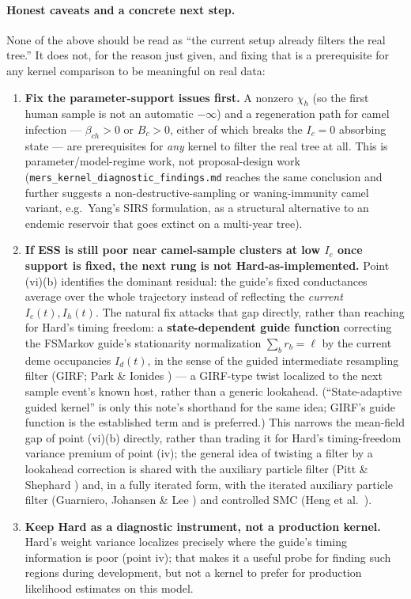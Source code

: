 \documentclass[11pt]{article}
\theoremstyle{plain}
\begin{document}
\paragraph{Honest caveats and a concrete next step.} None of the above should be read as ``the
current setup already filters the real tree.'' It does not, for the reason just given, and fixing
that is a prerequisite for any kernel comparison to be meaningful on real data:
\begin{enumerate}
\item \textbf{Fix the parameter-support issues first.} A nonzero $\chi_h$ (so the first human
sample is not an automatic $-\infty$) and a regeneration path for camel infection --- $\beta_{ch}>0$
or $B_c>0$, either of which breaks the $I_c=0$ absorbing state --- are prerequisites for \emph{any}
kernel to filter the real tree at all. This is parameter/model-regime work, not proposal-design
work (\texttt{mers\_kernel\_diagnostic\_findings.md} reaches the same conclusion and further
suggests a non-destructive-sampling or waning-immunity camel variant, e.g.\ Yang's SIRS
formulation, as a structural alternative to an endemic reservoir that goes extinct on a multi-year
tree).
\item \textbf{If ESS is still poor near camel-sample clusters at low $I_c$ once support is fixed,
the next rung is not Hard-as-implemented.} Point (vi)(b) identifies the dominant residual: the
guide's fixed conductances average over the whole trajectory instead of reflecting the
\emph{current} $I_c(t),I_h(t)$. The natural fix attacks that gap directly, rather than reaching for
Hard's timing freedom: a \textbf{state-dependent guide function} correcting the FSMarkov guide's
stationarity normalization $\sum_b r_b=\ell$ by the current deme occupancies $I_d(t)$, in the sense
of the guided intermediate resampling filter (GIRF; Park \& Ionides \cite{ParkIonides}) --- a
GIRF-type twist localized to the next sample event's known host, rather than a generic lookahead.
(``State-adaptive guided kernel'' is only this note's shorthand for the same idea; GIRF's guide
function is the established term and is preferred.) This narrows the mean-field gap of point
(vi)(b) directly, rather than trading it for Hard's timing-freedom variance premium of point (iv);
the general idea of twisting a filter by a lookahead correction is shared with the auxiliary
particle filter (Pitt \& Shephard \cite{PittShephard}) and, in a fully iterated form, with the
iterated auxiliary particle filter (Guarniero, Johansen \& Lee \cite{GuarnieroJL}) and controlled
SMC (Heng et al.\ \cite{HengEtAl}).
\item \textbf{Keep Hard as a diagnostic instrument, not a production kernel.} Hard's weight variance
localizes precisely where the guide's timing information is poor (point iv); that makes it a useful
probe for finding such regions during development, but not a kernel to prefer for production
likelihood estimates on this model.
\end{enumerate}
\end{document}
